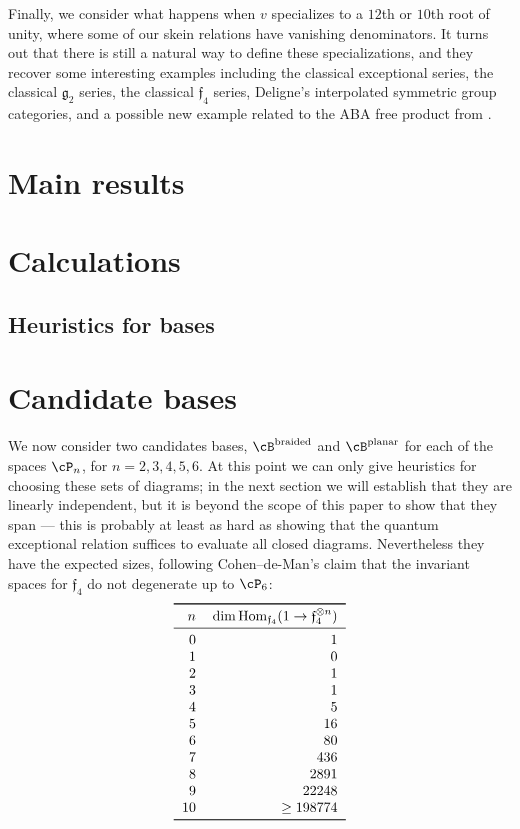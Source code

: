 \documentclass[12pt]{amsart}
\begin{document}
Finally, we consider what happens when $v$ specializes to a $12$th or $10$th
root of unity, where some of our skein relations have vanishing denominators.
It turns out that there is still a natural way to define these
specializations, and they recover some interesting examples including the
classical exceptional series, the classical $\mathfrak{g}_2$ series, the
classical $\mathfrak{f}_4$ series, Deligne's interpolated symmetric group
categories, and a possible new example related to the ABA free product from
\cite{???}.


\section{Main results}

\section{Calculations}
\label{sec:calculations}
\newcommand{\V}{\mathcal{P}}

\subsection{Heuristics for bases}
\section{Candidate bases}
We now consider two candidates bases, $\cB^{\text{braided}}$ and $\cB^{\text
{planar}}$ for each of the spaces $\cP_n$, for $n = 2,3,4,5,6$.
At this point we can only give heuristics for choosing these sets of diagrams;
in the next section we will establish that they are linearly independent, but
it is beyond the scope of this paper to show that they span --- this is
probably at least as hard as showing that the quantum exceptional relation
suffices to evaluate all closed diagrams. Nevertheless they have the expected
sizes, following Cohen--de-Man's claim that the invariant spaces for
$\mathfrak{f}_4$ do not degenerate up to $\cP_6$:
\[
\begin{tabular}{rr}
  \toprule
  $n$ & $\dim \Hom_{\mathfrak{f}_4} (1 \to \mathfrak{f}_4^{\otimes n})$ \\
  \midrule
  0 & 1 \\ 1 & 0 \\ 2 & 1 \\ 3 & 1 \\ 4 & 5 \\ 5 & 16 \\
  6 & 80 \\ 7 & 436 \\ 8 & 2891 \\ 9 & 22248 \\ 10 & $\ge 198774$ \\
  \bottomrule
\end{tabular}
\]
\end{document}
